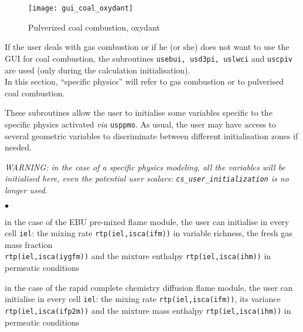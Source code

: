 {{{\begin{figure}[!ht]
\begin{center}
\texttt{[image: gui\_coal\_oxydant]}
\caption{Pulverized coal combustion, oxydant}
\label{fig:Ini-coal5}
\end{center}
\end{figure}

If the user deals with gas combustion or if he (or she) does not want to use the GUI for coal combustion, the subroutines \texttt{usebui, usd3pi, uslwci} and \texttt{uscpiv} are used (only during the calculation initialisation).\\
In this section, ``specific physics'' will refer to gas combustion or
to pulverised coal combustion.

These subroutines allow the user to initialise some variables specific
to the specific physics activated {\em via} \texttt{usppmo}. As usual,
the user may have access to several geometric variables to discriminate
between different initialisation zones if needed.

{\em WARNING: in the case of a specific physics modeling, all the
variables will be initialised here, even the potential user scalars: {\em
\texttt{cs\_user\_initialization}} is no longer used.}


\begin{list}{$\bullet$}{}
       \item in the case of the EBU pre-mixed flame module, the user can
             initialise in every cell \texttt{iel}: the mixing rate
             \texttt{rtp(iel,isca(ifm))} in variable richness, the
             fresh gas mass fraction \\
             \texttt{rtp(iel,isca(iygfm))}
             and the mixture enthalpy \texttt{rtp(iel,isca(ihm))} in
             permeatic conditions

        \item in the case of the rapid complete chemistry diffusion flame
             module, the user can initialise in every cell \texttt{iel}: the
             mixing rate \texttt{rtp(iel,isca(ifm))}, its variance
             \texttt{rtp(iel,isca(ifp2m))} and the mixture mass
             enthalpy \texttt{rtp(iel,isca(ihm))} in permeatic conditions


\end{list}}}}
